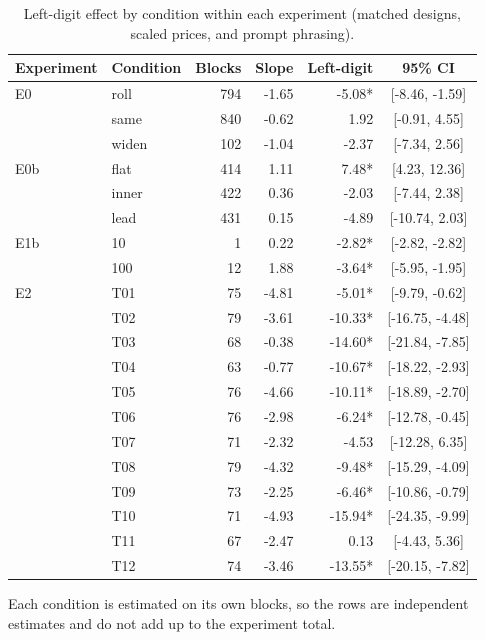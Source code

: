 \begin{table}[t]
\centering
\caption{Left-digit effect by condition within each experiment (matched designs, scaled prices, and prompt phrasing).}
\label{tab:bycond}
\small
\begin{tabular}{llrrrc}
\toprule
Experiment & Condition & Blocks & Slope & Left-digit & 95\% CI \\
\midrule
E0 & roll & 794 & -1.65 & -5.08* & [-8.46, -1.59] \\
 & same & 840 & -0.62 & 1.92 & [-0.91, 4.55] \\
 & widen & 102 & -1.04 & -2.37 & [-7.34, 2.56] \\ \addlinespace
E0b & flat & 414 & 1.11 & 7.48* & [4.23, 12.36] \\
 & inner & 422 & 0.36 & -2.03 & [-7.44, 2.38] \\
 & lead & 431 & 0.15 & -4.89 & [-10.74, 2.03] \\ \addlinespace
E1b & 10 &   1 & 0.22 & -2.82* & [-2.82, -2.82] \\
 & 100 &  12 & 1.88 & -3.64* & [-5.95, -1.95] \\ \addlinespace
E2 & T01 &  75 & -4.81 & -5.01* & [-9.79, -0.62] \\
 & T02 &  79 & -3.61 & -10.33* & [-16.75, -4.48] \\
 & T03 &  68 & -0.38 & -14.60* & [-21.84, -7.85] \\
 & T04 &  63 & -0.77 & -10.67* & [-18.22, -2.93] \\
 & T05 &  76 & -4.66 & -10.11* & [-18.89, -2.70] \\
 & T06 &  76 & -2.98 & -6.24* & [-12.78, -0.45] \\
 & T07 &  71 & -2.32 & -4.53 & [-12.28, 6.35] \\
 & T08 &  79 & -4.32 & -9.48* & [-15.29, -4.09] \\
 & T09 &  73 & -2.25 & -6.46* & [-10.86, -0.79] \\
 & T10 &  71 & -4.93 & -15.94* & [-24.35, -9.99] \\
 & T11 &  67 & -2.47 & 0.13 & [-4.43, 5.36] \\
 & T12 &  74 & -3.46 & -13.55* & [-20.15, -7.82] \\
\bottomrule
\end{tabular}
\vspace{2pt}
\parbox{\linewidth}{\footnotesize Each condition is estimated on its own blocks, so the rows are independent estimates and do not add up to the experiment total.}
\end{table}
